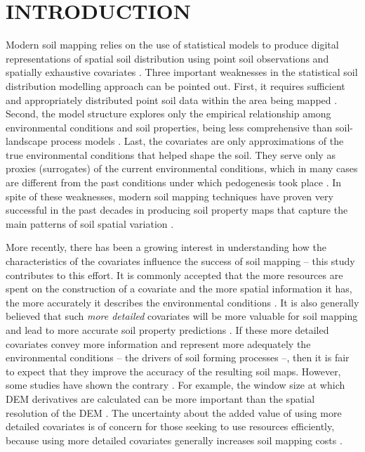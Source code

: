 \formatchapter

\section{INTRODUCTION}
\label{sec:chap06-intro}

Modern soil mapping relies on the use of statistical models to produce digital representations of spatial 
soil distribution using point soil observations and spatially exhaustive covariates \cite{McBratneyEtAl2003, 
ScullEtAl2003, Florinsky2012}. Three important weaknesses in the statistical soil distribution modelling 
approach can be pointed out. First, it requires sufficient and appropriately distributed point soil data 
within the area being mapped \cite{CarreEtAl2007a}. Second, the model structure explores only the empirical 
relationship among environmental conditions and soil properties, being less comprehensive than soil-landscape 
process models \cite{Grunwald2009}. Last, the covariates are only approximations of the true environmental 
conditions that helped shape the soil. They serve only as proxies (surrogates) of the current environmental 
conditions, which in many cases are different from the past conditions under which pedogenesis took place 
\cite{HeuvelinkEtAl2001}. In spite of these weaknesses, modern soil mapping techniques have proven very 
successful in the past decades in producing soil property maps that capture the main patterns of soil spatial 
variation \cite{MooreEtAl1993, McBratneyEtAl2000, Grunwald2009}.

More recently, there has been a growing interest in understanding how the characteristics of the covariates 
influence the success of soil mapping -- this study contributes to this effort. It is commonly accepted that 
the more resources are spent on the construction of a covariate and the more spatial information it has, the 
more accurately it describes the environmental conditions \cite{HupyEtAl2004, HenglEtAl2013a}. It is also 
generally believed that such \emph{more detailed} covariates will be more valuable for soil mapping and lead 
to more accurate soil property predictions \cite{CavazziEtAl2013, MaynardEtAl2014}. If these more detailed 
covariates convey more information and represent more adequately the environmental conditions -- the drivers 
of soil forming processes --, then it is fair to expect that they improve the accuracy of the resulting soil 
maps. However, some studies have shown the contrary \cite{ThompsonEtAl2001, EldeiryEtAl2008, KimEtAl2014}. For 
example, the window size at which DEM derivatives are calculated can be more important than the spatial 
resolution of the DEM \cite{Wood1996, ZhuEtAl2008, BehrensEtAl2010a}. The uncertainty about the added value of 
using more detailed covariates is of concern for those seeking to use resources efficiently, because using 
more detailed covariates generally increases soil mapping costs \cite{ShiEtAl2012}.

